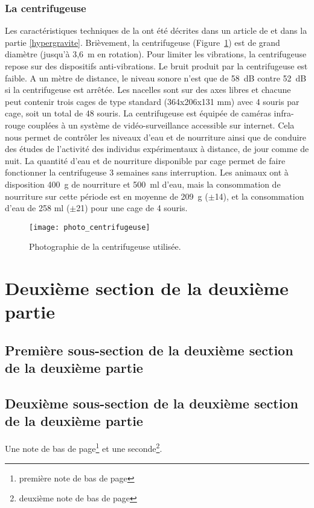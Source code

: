 \subsubsection{La centrifugeuse}
Les caractéristiques techniques de la  ont été décrites dans un article de \cite{jamon_ground-based_2008} et dans la partie \ref{hypergravite}. Brièvement, la centrifugeuse (Figure~\ref{photo_centrifugeuse}) est de grand diamètre (jusqu'à 3,6~m en rotation). Pour limiter les vibrations, la centrifugeuse repose sur des dispositifs anti-vibrations. Le bruit produit par la centrifugeuse est faible. A un mètre de distance, le niveau sonore n'est que de 58~dB contre 52~dB si la centrifugeuse est arrêtée. Les nacelles sont sur des axes libres et chacune peut contenir trois cages de type standard (364x206x131 mm) avec 4 souris par cage, soit un total de 48 souris. La centrifugeuse est équipée de caméras infra-rouge couplées à un système de vidéo-surveillance accessible sur internet. Cela nous permet de contrôler les niveaux d'eau et de nourriture ainsi que de conduire des études de l'activité des individus expérimentaux à distance, de jour comme de nuit. La quantité d'eau et de nourriture disponible par cage permet de faire fonctionner la centrifugeuse 3 semaines sans interruption. Les animaux ont à disposition 400~g de nourriture et 500~ml d'eau, mais la consommation de nourriture sur cette période est en moyenne de 209~g ($\pm$14), et la consommation d'eau de 258 ml ($\pm$21) pour une cage de 4 souris. 
\begin{figure}[h!tbp] %
\vspace{0.5cm}
\setcapindent{2em}
  \centering
  \texttt{[image: photo\_centrifugeuse]}
  \caption[Photographie de la centrifugeuse]{Photographie de la centrifugeuse utilisée.}
  \label{photo_centrifugeuse}
\end{figure}
\lipsum[1]
\section{Deuxième section de la deuxième partie}
\lipsum[2]
\subsection{Première sous-section de la deuxième section de la deuxième partie}
\lipsum[4]
\subsection[Sous-sous-sous-partie 2]{Deuxième sous-section de la deuxième section de la deuxième partie} %
\lipsum[4]Une note de bas de page\footnote{première note de bas de page} et une seconde\footnote{deuxième note de bas de page}.
